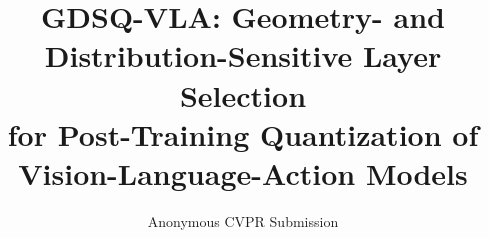 \documentclass[10pt,twocolumn,letterpaper]{article}
\title{GDSQ-VLA: Geometry- and Distribution-Sensitive Layer Selection\\
for Post-Training Quantization of Vision-Language-Action Models}
\author{Anonymous CVPR Submission}
\begin{document}
\maketitle







\label{sec:main-paper-end}

{
    \small
    
    
}

\clearpage
\appendix

\end{document}
